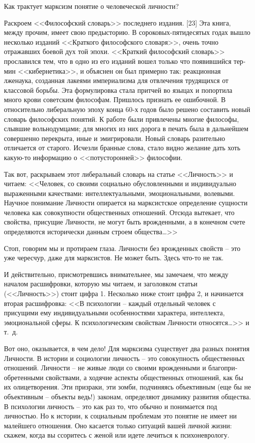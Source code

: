 \documentclass{book}
\begin{document}
Как трактует марксизм понятие о человеческой личности?

Раскроем <<Философский словарь>> последнего издания. [23] Эта книга, между прочим, имеет свою предысторию. В сороковых-пятидесятых 
годах вышло несколько изданий <<Краткого философского словаря>>, очень точно отражавших боевой дух той эпохи. <<Краткий философский 
словарь>> прославился тем, что в одно из его изданий вошел только что появившийся тер­мин <<кибернетика>>, и объяснен он был 
примерно так: реак­ционная лженаука, созданная лакеями империализма для отвле­чения трудящихся от классовой борьбы. Эта 
формулировка стала притчей во языцах и попортила много крови советским философам. Пришлось признать ее ошибочной. В относительно 
либеральную эпоху конца 60-х годов было решено составить новый словарь философских понятий. К работе были привлечены многие 
философы, слывшие вольнодумцами; для многих из них дорога в печать была в дальнейшем совершенно перекрыта, иные и эмигрировали. 
Новый словарь разительно отличается от старого. Исчезли бранные слова, стало видно же­лание дать хоть какую-то информацию о 
<<потусторонней>> философии.

Так вот, раскрываем этот либеральный словарь на статье <<Личность>> и читаем:
<<Человек, со своими социально обусловленными и индивидуально выраженными качествами: интеллектуальными, эмоциональными, 
волевыми. Научное понимание Личности опирается на марксистское определение сущности человека как со­вокупности общественных 
отношений. Отсюда вытекает, что свойства, присущие Личности, не могут быть врожденными, а в конечном счете определяются 
исторически данным строем общества\ldots>>

Стоп, говорим мы и протираем глаза. Личности без врож­денных свойств -- это уже чересчур, даже для марксистов. Не может быть. 
Здесь что-то не так.

И действительно, присмотревшись внимательнее, мы заме­чаем, что между началом расшифровки, которую мы читаем, и заголовком статьи 
(<<Личность>>) стоит цифра 1. Несколько ниже стоит цифра 2, и начинается вторая расшифровка:
<<В психологии -- каждый отдельный человек с присущими ему индивидуальными особенностями характера, интеллекта, эмоциональной 
сферы. К психологическим свойствам Лич­ности относятся\ldots>> и т.~д.

Вот оно, оказывается, в чем дело! Для марксизма сущест­вует два разных понятия Личности. В истории и социологии личность -- это 
совокупность общественных отношений. Лич­ности -- не живые люди со своими врожденными и благопри­обретенными свойствами, а ходячие 
аспекты общественных отношений, как бы их олицетворения. Эти призраки, эти зом­би, подчиняясь объективным (еще бы не объективным 
-- объек­ты ведь!) законам, определяют динамику развития общества. В психологии личность -- это как раз то, что обычно и 
понимает­ся под личностью. Но к истории, к социальным проблемам это понятие не имеет ни малейшего отношения. Оно касается только 
ситуаций вашей личной жизни: скажем, когда вы ссо­ритесь с женой или идете лечиться к психоневрологу.
\end{document}
